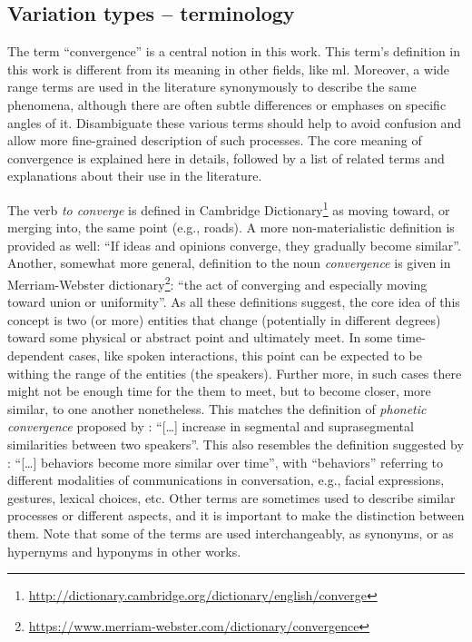 \subsection{Variation types -- terminology}
\label{subsec:variation_types}

The term \enquote{convergence} is a central notion in this work.
This term's definition in this work is different from its meaning in other fields, like \ac{ml}.
Moreover, a wide range terms are used in the literature synonymously to describe the same phenomena, although there are often subtle differences or emphases on specific angles of it.
Disambiguate these various terms should help to avoid confusion and allow more fine-grained description of such processes.
The core meaning of convergence is explained here in details, followed by a list of related terms and explanations about their use in the literature.

The verb \textit{to converge} is defined in Cambridge Dictionary\footnote{\url{http://dictionary.cambridge.org/dictionary/english/converge}} as moving toward, or merging into, the same point (e.g., roads).
A more non-materialistic definition is provided as well: \enquote{If ideas and opinions converge, they gradually become similar}.
Another, somewhat more general, definition to the noun \textit{convergence} is given in Merriam-Webster dictionary\footnote{\url{https://www.merriam-webster.com/dictionary/convergence}}: \enquote{the act of converging and especially moving toward union or uniformity}.
As all these definitions suggest, the core idea of this concept is two (or more) entities that change (potentially in different degrees) toward some physical or abstract point and ultimately meet.
In some time-dependent cases, like spoken interactions, this point can be expected to be withing the range of the entities (the speakers).
Further more, in such cases there might not be enough time for the them to meet, but to become closer, more similar, to one another nonetheless.
This matches the definition of \emph{phonetic convergence} proposed by \citet{Pardo2006phonetic}: \enquote{[\ldots] increase in segmental and suprasegmental similarities between two speakers}.
This also resembles the definition suggested by \citet{Xia2014prosodic}: \enquote{[\ldots] behaviors become more similar over time}, with \enquote{behaviors} referring to different modalities of communications in conversation, e.g., facial expressions, gestures, lexical choices, etc.
Other terms are sometimes used to describe similar processes or different aspects, and it is important to make the distinction between them.
Note that some of the terms are used interchangeably, as synonyms, or as hypernyms and hyponyms in other works.

